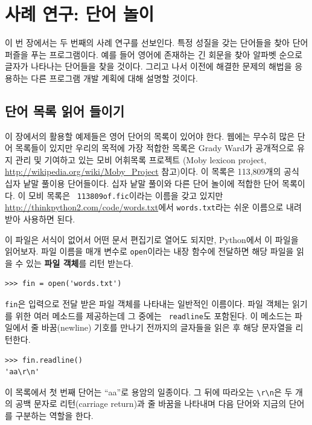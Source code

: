 \documentclass[10pt]{book}
\begin{document}
\chapter{사례 연구: 단어 놀이}
\label{wordplay}

이 번 장에서는 두 번째의 사례 연구를 선보인다.  특정 성질을 갖는
단어들을 찾아 단어 퍼즐을 푸는 프로그램이다.  예를 들어 영어에 존재하는
긴 회문을 찾아 알파벳 순으로 글자가 나타나는 단어들을 찾을 것이다.
그리고 나서 이전에 해결한 문제의 해법을 응용하는 다른 프로그램 개발
계획에 대해 설명할 것이다.



\section{단어 목록 읽어 들이기}
\label{wordlist}

이 장에서의 활용할 예제들은 영어 단어의 목록이 있어야 한다.  웹에는
무수히 많은 단어 목록들이 있지만 우리의 목적에 가장 적합한 목록은
Grady Ward가 공개적으로 유지 관리 및 기여하고 있는 모비 어휘목록
프로젝트 (Moby lexicon project,
\url{http://wikipedia.org/wiki/Moby_Project} 참고)이다.  이 목록은
113,809개의 공식 십자 낱말 풀이용 단어들이다. 십자 낱말 풀이와 다른
단어 놀이에 적합한 단어 목록이다.  이 모비 목록은 {\tt
  113809of.fic}이라는 이름을 갖고 있지만
\url{http://thinkpython2.com/code/words.txt}에서 {\tt words.txt}라는
쉬운 이름으로 내려 받아 사용하면 된다.

이 파일은 서식이 없어서 어떤 문서 편집기로 열어도 되지만, Python에서 이
파일을 읽어보자.  파일 이름을 매개 변수로 {\tt open}이라는 내장 함수에
전달하면 해당 파일을 읽을 수 있는 {\bf 파일 객체}를 리턴 받는다.

\begin{verbatim}
>>> fin = open('words.txt')
\end{verbatim}
%
{\tt fin}은 입력으로 전달 받은 파일 객체를 나타내는 일반적인 이름이다.
파일 객체는 읽기를 위한 여러 메소드를 제공하는데 그 중에는 {\tt
  readline}도 포함된다. 이 메소드는 파일에서 줄 바꿈(newline) 기호를 만나기
전까지의 글자들을 읽은 후 해당 문자열을 리턴한다.

\begin{verbatim}
>>> fin.readline()
'aa\r\n'
\end{verbatim}
%
이 목록에서 첫 번째 단어는 ``aa''로 용암의 일종이다.  그 뒤에 따라오는
\verb"\r\n"은 두 개의 공백 문자로 리턴(carriage return)과 줄 바꿈을
나타내며 다음 단어와 지금의 단어를 구분하는 역할을 한다.
\end{document}

